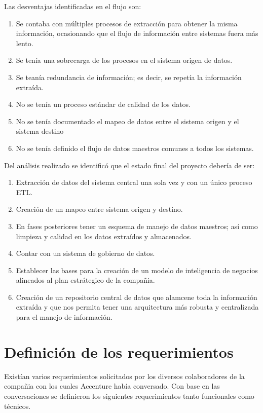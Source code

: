 Las desventajas identificadas en el flujo son:
\begin{enumerate}
\item Se contaba con múltiples procesos de extracción para obtener la misma información, ocasionando que el flujo de información entre sistemas fuera más lento.
\item Se tenía una sobrecarga de los procesos en el sistema origen de datos.
\item Se teanía redundancia de información; es decir, se repetía la información extraída.
\item No se tenía un proceso estándar de calidad de los datos.
\item No se tenía documentado el mapeo de datos entre el sistema origen y el sistema destino
\item No se tenía definido el flujo de datos maestros comunes a todos los sistemas.
\end{enumerate}

Del análisis realizado se identificó que el estado final del proyecto debería de ser:

\begin{enumerate}
\item Extracción de datos del sistema central una sola vez y con un único proceso ETL.
\item Creación de un mapeo entre sistema origen y destino.
\item En fases posteriores tener un esquema de manejo de datos maestros; así como limpieza y calidad en los datos extraídos y almacenados.
\item Contar con un sistema de gobierno de datos.
\item Establecer las bases para la creación de un modelo de inteligencia de negocios alineados al plan estrátegico de la compañia.
\item Creación de un repositorio central de datos que alamcene toda la información extraída y que nos permita tener una arquitectura más robusta y centralizada para el manejo de información.
\end{enumerate}

\section{Definición de los requerimientos}

Existían varios requerimientos solicitados por los diversos colaboradores de la compañia con los cuales Accenture había conversado. Con base en las conversaciones se definieron los siguientes requerimientos tanto funcionales como técnicos.

